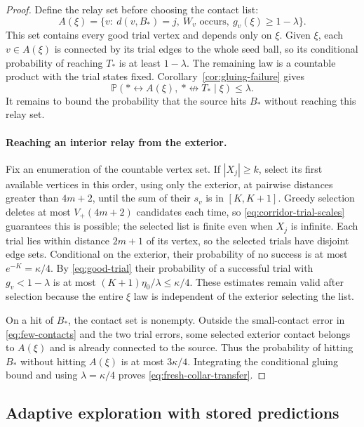 \documentclass[11pt]{article}
\theoremstyle{definition}
\newcommand{\PP}{\mathbb P}
\begin{document}
\begin{proof}
Define the relay set before choosing the contact list:
\[
 A(\xi)=\{v:\ d(v,B_*)=j,\ W_v\text{ occurs},\ g_v(\xi)\ge1-\lambda\}.
\]
This set contains every good trial vertex and depends only on $\xi$.
Given $\xi$, each $v\in A(\xi)$ is connected by its trial edges to
the whole seed ball, so its conditional probability of reaching $T_*$
is at least $1-\lambda$. The remaining law is a countable product
with the trial states fixed. Corollary~\ref{cor:gluing-failure} gives
\begin{equation*}
 \PP(*\leftrightarrow A(\xi),\ *\nleftrightarrow T_*\mid\xi)
       \le\lambda.
\end{equation*}
It remains to bound the probability that the source hits $B_*$
without reaching this relay set.

\paragraph{Reaching an interior relay from the exterior.}
Fix an enumeration of the countable vertex set. If $|X_j|\ge k$,
select its first available vertices in this order, using only the
exterior, at pairwise distances greater than $4m+2$, until
the sum of their $s_v$ is in $[K,K+1]$. Greedy selection deletes at
most $V_+(4m+2)$ candidates each time, so
\eqref{eq:corridor-trial-scales} guarantees this is possible; the
selected list is finite even when $X_j$ is infinite. Each trial lies
within distance $2m+1$ of its vertex, so the selected trials have
disjoint edge sets. Conditional on the exterior, their probability
of no success is at most $e^{-K}=\kappa/4$. By
\eqref{eq:good-trial} their probability of a successful trial with
$g_v<1-\lambda$ is at most
$(K+1)\eta_0/\lambda\le\kappa/4$. These estimates remain valid
after selection because the entire $\xi$ law is independent of
the exterior selecting the list.

On a hit of $B_*$, the contact set is nonempty. Outside the small-contact
error in \eqref{eq:few-contacts} and the two trial errors, some selected
exterior contact belongs to $A(\xi)$ and is already connected to the
source. Thus the probability of hitting $B_*$ without hitting $A(\xi)$
is at most $3\kappa/4$. Integrating the conditional gluing bound and
using $\lambda=\kappa/4$ proves \eqref{eq:fresh-collar-transfer}.
\end{proof}

\subsection{Adaptive exploration with stored predictions}
\end{document}

